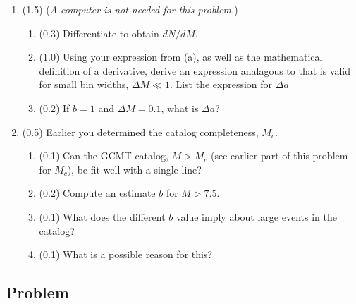 \documentclass[11pt,titlepage,fleqn]{article}
\begin{document}
\begin{enumerate}
\item  (1.5) ({\em A computer is not needed for this problem.})
%
\begin{enumerate}
\item (0.3) Differentiate  to obtain $d N/ d M$.


\item (1.0) Using your expression from (a), as well as the mathematical definition of a derivative, derive an expression analagous to  that is valid for small bin widths, $\Delta M \ll 1$. List the expression for $\Delta a$

\item (0.2) If $b = 1$ and $\Delta M = 0.1$, what is $\Delta a$?

\end{enumerate}


\item (0.5) Earlier you determined the catalog completeness, $M_c$.
%
\begin{enumerate}
\item (0.1) Can the GCMT catalog, $M > M_c$ (see earlier part of this problem for $M_c$), be fit well with a single line?
\item (0.2) Compute an estimate $b$ for $M > 7.5$.
\item (0.1) What does the different $b$ value imply about large events in the catalog?
\item (0.1) What is a possible reason for this?
\end{enumerate}

\end{enumerate}


\subsection*{Problem} \howmuchtime\




\iffalse
\begin{figure}[h]
\hspace{-1cm}
\texttt{[image: gcmt\_catalog.eps]}
\caption[]
{{
GCMT catalog.
\label{fig:gcmt}
}}
\end{figure}
\fi

\end{document}
